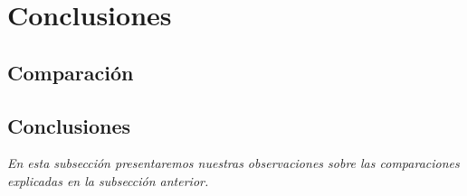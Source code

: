 \section{Conclusiones}

\subsection{Comparaci\'on}


\subsection{Conclusiones}

\textsl{En esta subsecci\'on presentaremos nuestras observaciones
sobre las comparaciones explicadas en la subsecci\'on anterior.}

\vspace*{0.5cm}






